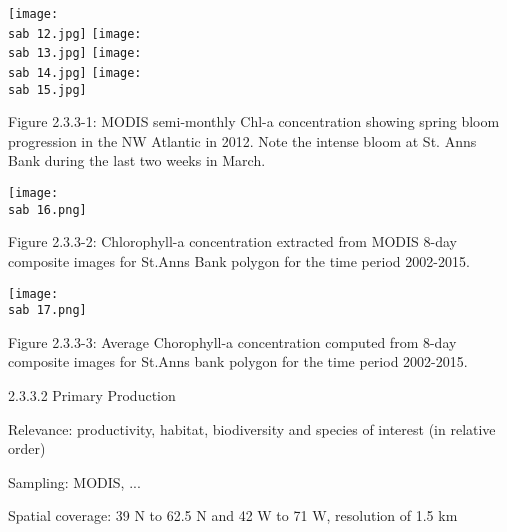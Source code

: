 \documentclass[letterpaper,portrait,12pt]{scrartcl}
\numberwithin{equation}{section}		%
\numberwithin{figure}{section}			%
\numberwithin{table}{section}				%
\newcommand{\sab}{\string~/ecomod_data/mpa/sab/}   %
\begin{document}
\texttt{[image: \\sab 12.jpg]}
\texttt{[image: \\sab 13.jpg]}
\texttt{[image: \\sab 14.jpg]}
\texttt{[image: \\sab 15.jpg]}





Figure 2.3.3-1: MODIS semi-monthly Chl-a concentration showing spring bloom progression in the NW Atlantic in 2012. Note the intense bloom at St. Anns Bank during the last two weeks in March.














\texttt{[image: \\sab 16.png]}





Figure 2.3.3-2: Chlorophyll-a concentration extracted from MODIS 8-day composite images for St.Anns Bank polygon for the time period 2002-2015.









\texttt{[image: \\sab 17.png]}





Figure 2.3.3-3: Average Chorophyll-a concentration computed from 8-day composite images for St.Anns bank polygon for the time period 2002-2015. 














2.3.3.2  Primary Production 









Relevance:  productivity, habitat, biodiversity and species of interest (in relative order)




Sampling:  MODIS, ...




Spatial coverage: \colorbox[rgb]{0.000,1.000,1.000}{39 N to 62.5 N and 42 W to 71 W,} resolution of 1.5 km
\end{document}

